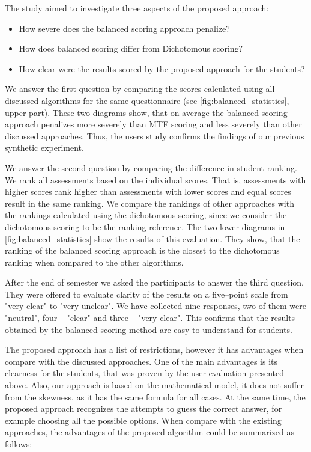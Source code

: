 \documentclass[ngerman,UKenglish,table]{scrbook}
\begin{document}
The study aimed to investigate three aspects of the proposed approach:

\begin{itemize}
  \item How severe does the balanced scoring approach penalize?
  \item How does balanced scoring differ from Dichotomous scoring?
  \item How clear were the results scored by the proposed approach for the students?
\end{itemize}

We answer the first question by comparing the scores calculated using all discussed algorithms for the same questionnaire (see \autoref{fig:balanced_statistics}, upper part).
These two diagrams show, that on average the balanced scoring approach penalizes more severely than MTF scoring and less severely than other discussed approaches.
Thus, the users study confirms the findings of our previous synthetic experiment.

We answer the second question by comparing the difference in student ranking.
We rank all assessments based on the individual scores.
That is, assessments with higher scores rank higher than assessments with lower scores and equal scores result in the same ranking.
We compare the rankings of other approaches with the rankings calculated using the dichotomous scoring, since we consider the dichotomous scoring to be the ranking reference.
The two lower diagrams in \autoref{fig:balanced_statistics} show the results of this evaluation.
They show, that the ranking of the balanced scoring approach is the closest to the dichotomous ranking when compared to the other algorithms.

After the end of semester we asked the participants to answer the third question. 
They were offered to evaluate clarity of the results on a five--point scale from "very clear" to "very unclear".
We have collected nine responses, two of them were "neutral", four -- "clear" and three -- "very clear".
This confirms that the results obtained by the balanced scoring method are easy to understand for students.

The proposed approach has a list of restrictions, however it has advantages when compare with the discussed approaches.
One of the main advantages is its clearness for the students, that was proven by the user evaluation presented above.
Also, our approach is based on the mathematical model, it does not suffer from the skewness, as it has the same formula for all cases.
At the same time, the proposed approach recognizes the attempts to guess the correct answer, for example choosing all the possible options.
When compare with the existing approaches, the advantages of the proposed algorithm could be summarized as follows:
\end{document}
